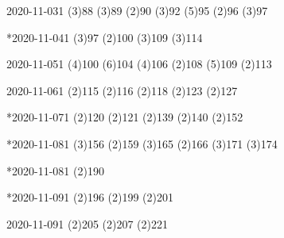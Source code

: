 \documentclass{ctexart}
\begin{document}
\begin{sdpolitics}{2020-11-03}{1}
  \addto[2020-11-06](3){88}
  \addto[2020-11-06](3){89}
  \addto[2020-11-07](2){90}
  \addto[2020-11-06](3){92}
  \addto[2020-11-08](5){95}
  \addto[2020-11-13](2){96}
  \addto[2020-11-06](3){97}
\end{sdpolitics}

\begin{sdpolitics}*{2020-11-04}{1}
  \addto[2020-11-06](3){97}
  \addto[2020-11-08](2){100}
  \addto[2020-11-06](3){109}
  \addto[2020-11-06](3){114}
\end{sdpolitics}

\begin{sdpolitics}{2020-11-05}{1}
  \addto[2020-11-07](4){100}
  \addto[2020-11-13](6){104}
  \addto[2020-11-07](4){106}
  \addto[2020-11-10](2){108}
  \addto[2020-11-10](5){109}
  \addto[2020-11-10](2){113}
\end{sdpolitics}

\begin{sdpolitics}{2020-11-06}{1}
  \addto[2020-11-08](2){115}
  \addto[2020-11-09](2){116}
  \addto[2020-11-09](2){118}
  \addto[2020-11-09](2){123}
  \addto[2020-11-09](2){127}
\end{sdpolitics}

\begin{sdpolitics}*{2020-11-07}{1}
  \addto[2020-11-17](2){120}
  \addto[2020-11-17](2){121}
  \addto[2020-11-17](2){139}
  \addto[2020-11-09](2){140}
  \addto[2020-11-17](2){152}
\end{sdpolitics}

\begin{sdpolitics}*{2020-11-08}{1}
  \addto[2020-11-14](3){156}
  \addto[2020-11-11](2){159}
  \addto[2020-11-14](3){165}
  \addto[2020-11-18](2){166}
  \addto[2020-11-14](3){171}
  \addto[2020-11-14](3){174}
\end{sdpolitics}

\begin{sdpolitics}*{2020-11-08}{1}
  \addto[2020-11-11](2){190}
\end{sdpolitics}

\begin{sdpolitics}*{2020-11-09}{1}
  \addto[2020-11-12](2){196}
  \addto[2020-11-12](2){199}
  \addto[2020-11-12](2){201}
\end{sdpolitics}

\begin{sdpolitics}{2020-11-09}{1}
  \addto[2020-11-12](2){205}
  \addto[2020-11-12](2){207}
  \addto[2020-11-12](2){221}
\end{sdpolitics}
\end{document}
